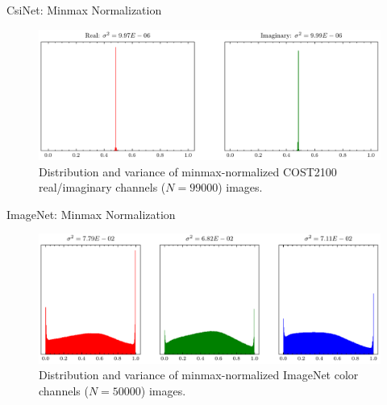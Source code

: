 \documentclass{beamer}
\begin{document}
    \begin{frame}{CsiNet: Minmax Normalization}
      \begin{figure}[htb]
        \centering
        \includegraphics[width=.9\textwidth]{cost2100_indoor_dist.pdf}
        \medskip
        \caption{Distribution and variance of minmax-normalized COST2100 real/imaginary channels ($N=99000$) images.}
        \label{fig:cost_indoor_dist}
      \end{figure}
    \end{frame}

    \begin{frame}{ImageNet: Minmax Normalization}
      \begin{figure}[htb]
        \centering
        \includegraphics[width=.9\textwidth]{imagenet_rgb_dist.pdf}
        \medskip
        \caption{Distribution and variance of minmax-normalized ImageNet color channels ($N=50000$) images.}
        \label{fig:imagenet_dist}
      \end{figure}
    \end{frame}
\end{document}
